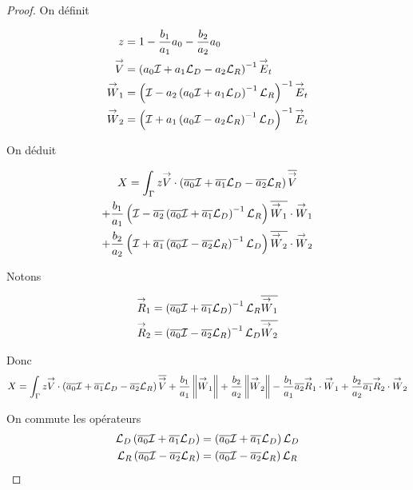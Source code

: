 \begin{proof}
    On définit

    \newcommand{\vV}{\vect{V}}
    \newcommand{\vW}{\vect{W}}

    \begin{align*}
      z &= 1-\frac{b_1}{a_1}a_0 -\frac{b_2}{a_2}a_0
      \\
      \vV & = \left(a_0\oI  + a_1 \LD - a_2\LR \right)^{-1} \vE_t
      \\
      \vW_1 & = \left( \oI - a_2 \left( a_0\oI + a_1\LD\right)^{-1}\LR\right)^{-1} \vE_t
      \\
      \vW_2 & = \left( \oI + a_1 \left( a_0\oI - a_2\LR\right)^{-1}\LD\right)^{-1} \vE_t
    \end{align*}

    On déduit

    \begin{multline*}
      X = \int_\Gamma z \vV \cdot \left(\conj{a_0}\oI  + \conj{a_1} \LD - \conj{a_2}\LR\right)\conj{\vV}
      \\
      + \frac{b_1}{a_1} \left( \oI - \conj{a_2} \left( \conj{a_0}\oI + \conj{a_1}\LD\right)^{-1}\LR\right)\conj{\vW_1}\cdot\vW_1
      \\
      + \frac{b_2}{a_2} \left( \oI + \conj{a_1} \left( \conj{a_0}\oI - \conj{a_2}\LR\right)^{-1}\LD\right)\conj{\vW_2}\cdot\vW_2
    \end{multline*}

    Notons

    \newcommand{\vR}{\vect{R}}

    \begin{align*}
      \vR_1 & = \left(\conj{a_0}\oI  + \conj{a_1} \LD \right)^{-1}\LR \conj{\vW_1}
      \\
      \vR_2 & = \left(\conj{a_0}\oI  - \conj{a_2} \LR \right)^{-1}\LD \conj{\vW_2}
    \end{align*}

    Donc 
    \begin{equation*}
      X = \int_\Gamma z \vV \cdot \left(\conj{a_0}\oI  + \conj{a_1} \LD - \conj{a_2}\LR\right)\conj{\vV} + \frac{b_1}{a_1} \norm{\vW_1} +\frac{b_2}{a_2} \norm{\vW_2} - \frac{b_1}{a_1}\conj{a_2}\vR_1\cdot\vW_1 + \frac{b_2}{a_2}\conj{a_1}\vR_2\cdot\vW_2
    \end{equation*}

    On commute les opérateurs
    \begin{align*}
      {\mathcal{L}_D}\left({\overline{a_0}}{\mathcal{I}}  + {\overline{a_1}} {\mathcal{L}_D} \right)&=\left({\overline{a_0}}{\mathcal{I}}  + {\overline{a_1}} {\mathcal{L}_D} \right){\mathcal{L}_D}
      \\
      {\mathcal{L}_R}\left({\overline{a_0}}{\mathcal{I}}  - {\overline{a_2}} {\mathcal{L}_R} \right)&=\left({\overline{a_0}}{\mathcal{I}}  - {\overline{a_2}} {\mathcal{L}_R} \right){\mathcal{L}_R}
    \end{align*}


\end{proof}
